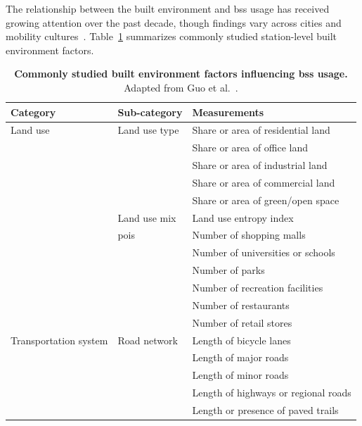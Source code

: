         The relationship between the built environment and \ac{bss} usage has received growing attention over the past decade, though findings vary across cities and mobility cultures~\cite{Guo2022}. Table~\ref{tab:built-environment-factors} summarizes commonly studied station-level built environment factors.

        \begin{table}[hpbt!]
            \caption[Commonly studied built environment factors influencing BSS usage]{
                \textbf{Commonly studied built environment factors influencing \ac{bss} usage.} 
                Adapted from Guo et al.~\cite{Guo2022}.
            }
            \label{tab:built-environment-factors}
            \centering
            {\footnotesize 
            \begin{tabular}{lll}
                \toprule
                Category & Sub-category & Measurements \\
                \midrule
                Land use & Land use type & Share or area of residential land \\
                & & Share or area of office land \\
                & & Share or area of industrial land \\
                & & Share or area of commercial land \\
                & & Share or area of green/open space \\
                & Land use mix & Land use entropy index \\
                & 	\acp{poi} & Number of shopping malls \\
                & & Number of universities or schools \\
                & & Number of parks \\
                & & Number of recreation facilities \\
                & & Number of restaurants \\
                & & Number of retail stores \\
                \midrule
                Transportation system & Road network & Length of bicycle lanes \\
                & & Length of major roads \\
                & & Length of minor roads \\
                & & Length of highways or regional roads \\
                & & Length or presence of paved trails \\

\end{tabular}}
\end{table}
